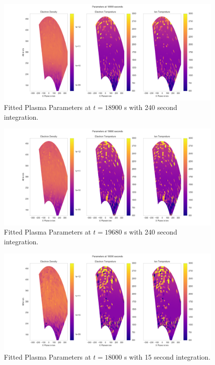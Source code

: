 \documentclass[draft,ras]{agutex}
\begin{document}
\begin{article}
\begin{figure}[!t]
\centering
\includegraphics[width=5in]{0960_240_int}
\caption{Fitted Plasma Parameters at $t=18900$ s with 240 second integration.}
\label{fig:f240plparamst60}
\end{figure}


\begin{figure}[!t]
\centering
\includegraphics[width=5in]{1680_240_int}
\caption{Fitted Plasma Parameters at $t=19680$ s with 240 second integration.}
\label{fig:f240plparamst120}
\end{figure}

\begin{figure}[!t]
\centering
\includegraphics[width=5in]{0000_15_int}
\caption{Fitted Plasma Parameters at $t=18000$ s with 15 second integration.}
\label{fig:f15plparamst0}
\end{figure}


\end{article}
\end{document}
